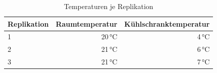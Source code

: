 \begin{table}
\centering
\caption{Temperaturen je Replikation}
\label{table:temperaturen}
\begin{tabular}{|l|r|r|}
\hline
Replikation & Raumtemperatur & Kühlschranktemperatur \\
\hline
1           & 20\,°C         & 4\,°C \\
2           & 21\,°C         & 6\,°C \\
3           & 21\,°C         & 7\,°C \\
\hline
\end{tabular}
\end{table}

